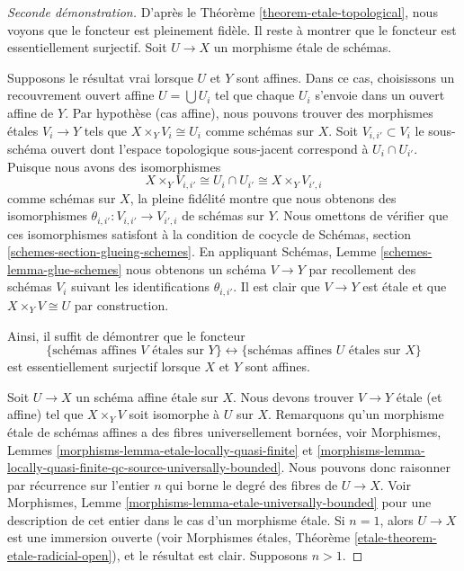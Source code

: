 \begin{proof}[Seconde d\'emonstration]
D'apr\`es le Th\'eor\`eme \ref{theorem-etale-topological},
nous voyons que le foncteur est pleinement fid\`ele.
Il reste \`a montrer que le foncteur est essentiellement surjectif.
Soit $U \to X$ un morphisme \'etale de sch\'emas.

\medskip\noindent
Supposons le r\'esultat vrai lorsque $U$ et $Y$ sont affines.
Dans ce cas, choisissons un recouvrement ouvert affine
$U = \bigcup U_i$ tel que chaque $U_i$ s'envoie
dans un ouvert affine de $Y$. Par hypoth\`ese (cas affine), nous pouvons
trouver des morphismes \'etales $V_i \to Y$ tels que $X \times_Y V_i \cong U_i$
comme sch\'emas sur $X$. Soit $V_{i, i'} \subset V_i$
le sous-sch\'ema ouvert dont l'espace topologique sous-jacent
correspond \`a $U_i \cap U_{i'}$. Puisque nous avons des isomorphismes
$$
X \times_Y V_{i, i'} \cong U_i \cap U_{i'} \cong X \times_Y V_{i', i}
$$
comme sch\'emas sur $X$, la pleine fid\'elit\'e montre que nous
obtenons des isomorphismes
$\theta_{i, i'} : V_{i, i'} \to V_{i', i}$ de sch\'emas sur $Y$.
Nous omettons de v\'erifier que ces isomorphismes satisfont \`a la
condition de cocycle de Schémas, section \ref{schemes-section-glueing-schemes}.
En appliquant Schémas, Lemme \ref{schemes-lemma-glue-schemes}
nous obtenons un sch\'ema $V \to Y$ par
recollement des sch\'emas $V_i$ suivant les identifications $\theta_{i, i'}$.
Il est clair que $V \to Y$ est \'etale et que $X \times_Y V \cong U$
par construction.

\medskip\noindent
Ainsi, il suffit de d\'emontrer que le foncteur
\begin{equation}
\label{equation-affine-etale}
\{
\text{sch\'emas affines }V\text{ \'etales sur }Y
\}
\leftrightarrow
\{
\text{sch\'emas affines }U\text{ \'etales sur }X
\}
\end{equation}
est essentiellement surjectif lorsque $X$ et $Y$ sont affines.

\medskip\noindent
Soit $U \to X$ un sch\'ema affine \'etale sur $X$.
Nous devons trouver $V \to Y$ \'etale (et affine) tel que $X \times_Y V$
soit isomorphe \`a $U$ sur $X$. Remarquons qu'un morphisme \'etale de sch\'emas affines
a des fibres universellement born\'ees, voir
Morphismes,
Lemmes \ref{morphisms-lemma-etale-locally-quasi-finite} et
\ref{morphisms-lemma-locally-quasi-finite-qc-source-universally-bounded}.
Nous pouvons donc raisonner par r\'ecurrence sur l'entier $n$ qui borne le degr\'e des fibres
de $U \to X$. Voir
Morphismes, Lemme \ref{morphisms-lemma-etale-universally-bounded}
pour une description de cet entier dans le cas d'un morphisme \'etale.
Si $n = 1$, alors $U \to X$ est une immersion ouverte (voir
Morphismes étales, Th\'eor\`eme \ref{etale-theorem-etale-radicial-open}),
et le r\'esultat est clair. Supposons $n > 1$.


\end{proof}
